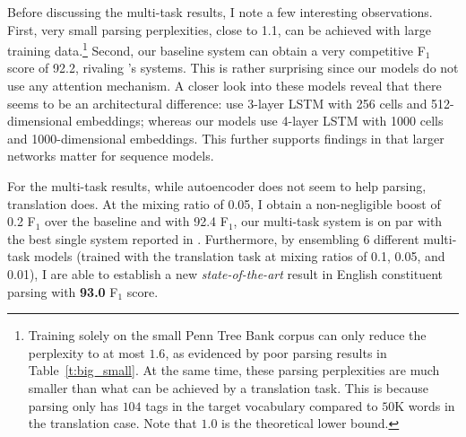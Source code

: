 Before discussing the multi-task results, I note a few interesting
observations. First, very small parsing perplexities, close to 1.1, can be achieved with large
training data.\footnote{Training solely on the small Penn Tree Bank
corpus can only reduce the perplexity to at most $1.6$, as evidenced by poor
parsing results in Table~\ref{t:big_small}. At the same time, these parsing
perplexities are much smaller than
what can be achieved by a translation task. This is because parsing only has
$104$ tags in the target vocabulary compared to
$50$K words in the translation case. Note that $1.0$ is the theoretical
lower bound.}  
Second, our baseline system can obtain a very competitive F$_1$ score of
92.2, rivaling \citet{vinyals15grammar}'s systems. This is rather surprising
since our models do not use any attention mechanism. A closer look into these
models reveal that there seems to be an architectural difference:
\citet{vinyals15grammar} use 3-layer LSTM with 256 cells and
512-dimensional embeddings; whereas our models use 4-layer LSTM with 1000 cells and
1000-dimensional embeddings. This further supports findings in \citep{rafal16} that
larger networks matter for sequence models.

For the multi-task results, while autoencoder does not seem to help parsing,
translation does. At the mixing ratio of 0.05, I obtain a non-negligible boost of 0.2 F$_1$ 
over the baseline and with 92.4 F$_1$, our multi-task system is on par with the best single system reported in
\citep{vinyals15grammar}. Furthermore, by ensembling 6 different multi-task
models (trained with the translation task at mixing ratios of
0.1, 0.05, and 0.01), I are able to establish a new {\it state-of-the-art} result in
English constituent parsing with {\bf 93.0} F$_1$ score.

